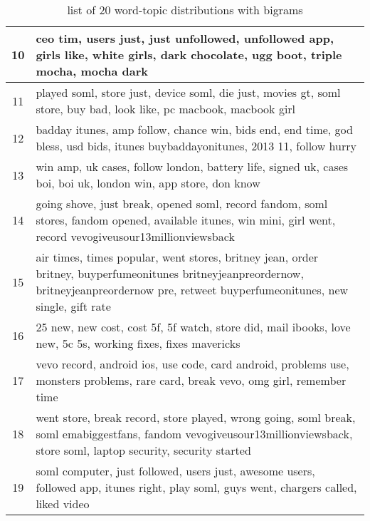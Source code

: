 \begin{table}
\begin{tabular}{c p{16cm}}
    10    & ceo tim, users just, just unfollowed, unfollowed app, girls like, white girls, dark chocolate, ugg boot, triple mocha, mocha dark \\ \midrule
    11    & played soml, store just, device soml, die just, movies gt, soml store, buy bad, look like, pc macbook, macbook girl \\ \midrule
    12    & badday itunes, amp follow, chance win, bids end, end time, god bless, usd bids, itunes buybaddayonitunes, 2013 11, follow hurry \\ \midrule
    13    & win amp, uk cases, follow london, battery life, signed uk, cases boi, boi uk, london win, app store, don know \\ \midrule
    14    & going shove, just break, opened soml, record fandom, soml stores, fandom opened, available itunes, win mini, girl went, record vevogiveusour13millionviewsback \\ \midrule
    15    & air times, times popular, went stores, britney jean, order britney, buyperfumeonitunes britneyjeanpreordernow, britneyjeanpreordernow pre, retweet buyperfumeonitunes, new single, gift rate \\ \midrule
    16    & 25 new, new cost, cost 5f, 5f watch, store did, mail ibooks, love new, 5c 5s, working fixes, fixes mavericks \\ \midrule
    17    & vevo record, android ios, use code, card android, problems use, monsters problems, rare card, break vevo, omg girl, remember time \\ \midrule
    18    & went store, break record, store played, wrong going, soml break, soml emabiggestfans, fandom vevogiveusour13millionviewsback, store soml, laptop security, security started \\ \midrule
    19    & soml computer, just followed, users just, awesome users, followed app, itunes right, play soml, guys went, chargers called, liked video \\ \bottomrule
  \end{tabular}
  \caption{list of 20 word-topic distributions with bigrams}
  \label{tab:bigrams_lda}
\end{table}


